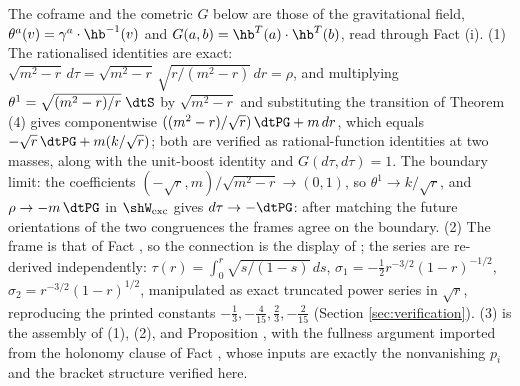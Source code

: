 The coframe and the cometric $G$ below are those of the gravitational field, $\theta^a(v) = \gamma^a \cdot \hb^{-1}(v)$ and $G(a,b) = \hb^{T}(a) \cdot \hb^{T}(b)$, read through Fact (i). (1) The rationalised identities are exact: $\sqrt{m^2-r}\,d\tau = \sqrt{m^2-r}\,\sqrt{r/(m^2-r)}\,dr = \rho$, and multiplying $\theta^1 = \sqrt{(m^2-r)/r}\;\dtS$ by $\sqrt{m^2-r}$ and substituting the transition of Theorem (4) gives componentwise $((m^2-r)/\sqrt r)\,\dtPG + m\,dr$, which equals $-\sqrt r\,\dtPG + m(k/\sqrt r)$; both are verified as rational-function identities at two masses, along with the unit-boost identity and $G(d\tau,d\tau) = 1$. The boundary limit: the coefficients $(-\sqrt r, m)/\sqrt{m^2-r} \to (0,1)$, so $\theta^1 \to k/\sqrt r$, and $\rho \to -m\,\dtPG$ in $\shW_{\mathrm{exc}}$ gives $d\tau \to -\dtPG$: after matching the future orientations of the two congruences the frames agree on the boundary. (2) The frame is that of Fact , so the connection is the display of ; the series are re-derived independently: $\tau(r) = \int_0^r \sqrt{s/(1-s)}\,ds$, $\sigma_1 = -\tfrac12 r^{-3/2}(1-r)^{-1/2}$, $\sigma_2 = r^{-3/2}(1-r)^{1/2}$, manipulated as exact truncated power series in $\sqrt r$, reproducing the printed constants $-\tfrac13, -\tfrac{4}{15}, \tfrac23, -\tfrac{2}{15}$ (Section \ref{sec:verification}). (3) is the assembly of (1), (2), and Proposition , with the fullness argument imported from the holonomy clause of Fact , whose inputs are exactly the nonvanishing $p_i$ and the bracket structure verified here.
